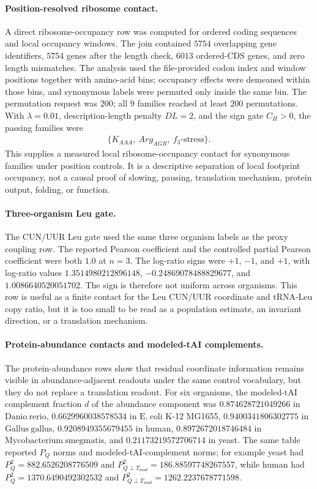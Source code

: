 \paragraph{Position-resolved ribosome contact.}
A direct ribosome-occupancy row was computed for ordered coding sequences and local occupancy windows.  The join contained $5754$ overlapping gene identifiers, $5754$ genes after the length check, $6013$ ordered-CDS genes, and zero length mismatches.  The analysis used the file-provided codon index and window positions together with amino-acid bins; occupancy effects were demeaned within those bins, and synonymous labels were permuted only inside the same bin.  The permutation request was $200$; all $9$ families reached at least $200$ permutations.  With $\lambda=0.01$, description-length penalty $DL=2$, and the sign gate $C_H>0$, the passing families were
$$
\begin{aligned}
\{K_{AAA},\ Arg_{AGR},\ f_3\text{-stress}\}.
\end{aligned}
$$
This supplies a measured local ribosome-occupancy contact for synonymous families under position controls.  It is a descriptive separation of local footprint occupancy, not a causal proof of slowing, pausing, translation mechanism, protein output, folding, or function.

\paragraph{Three-organism Leu gate.}
The CUN/UUR Leu gate used the same three organism labels as the proxy coupling row.  The reported Pearson coefficient and the controlled partial Pearson coefficient were both $1.0$ at $n=3$.  The log-ratio signs were $+1$, $-1$, and $+1$, with log-ratio values $1.3514980212896148$, $-0.24869078488829677$, and $1.0086640520051702$.  The sign is therefore not uniform across organisms.  This row is useful as a finite contact for the Leu CUN/UUR coordinate and tRNA-Leu copy ratio, but it is too small to be read as a population estimate, an invariant direction, or a translation mechanism.

\paragraph{Protein-abundance contacts and modeled-tAI complements.}
The protein-abundance rows show that residual coordinate information remains visible in abundance-adjacent readouts under the same control vocabulary, but they do not replace a translation readout.  For six organisms, the modeled-tAI complement fraction $d$ of the abundance component was $0.874628721049266$ in $\mathrm{Danio\ rerio}$, $0.6629960038578534$ in $\mathrm{E.\ coli}$ K-12 MG1655, $0.9400341806302775$ in $\mathrm{Gallus\ gallus}$, $0.9208949355679455$ in human, $0.8972672018746484$ in $\mathrm{Mycobacterium\ smegmatis}$, and $0.21173219572706714$ in yeast.  The same table reported $P_Q$ norms and modeled-tAI-complement norms; for example yeast had $P_Q^2=882.6526208776509$ and $P_{Q\perp T_{mod}}^2=186.88597748267557$, while human had $P_Q^2=1370.6490492302532$ and $P_{Q\perp T_{mod}}^2=1262.2237678771598$.

